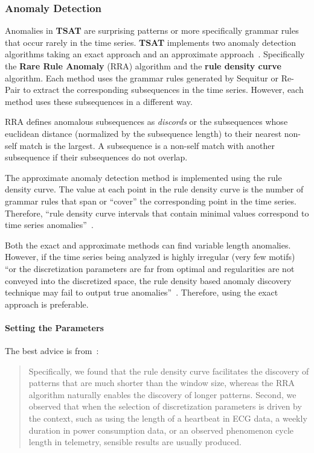 \documentclass[titlepage, letterpaper, 12pt]{article}
\newcommand\TSAT{\textbf{TSAT}}
\begin{document}
\subsubsection{Anomaly Detection}
\label{anomalybackground}




Anomalies in {\TSAT} are surprising patterns or more specifically grammar rules that occur rarely in the time series.   {\TSAT} implements two anomaly detection algorithms taking an exact approach and an approximate approach~\cite{senin2015time}.  Specifically the \textbf{Rare Rule Anomaly} (RRA) algorithm and the \textbf{rule density curve} algorithm.  Each method uses the grammar rules generated by Sequitur or Re-Pair to extract the corresponding subsequences in the time series.  However, each method uses these subsequences in a different way.

RRA defines anomalous subsequences as \textit{discords} or the subsequences whose euclidean distance (normalized by the subsequence length) to their nearest non-self match is the largest.  A subsequence is a non-self match with another subsequence if their subsequences do not overlap. 

The approximate anomaly detection method is implemented using the rule density curve.  The value at each point in the rule density curve is the number of grammar rules that span or ``cover'' the corresponding point in the time series.  Therefore, ``rule density curve intervals that contain minimal values correspond to time series anomalies''~\cite{senin2015time}.  

Both the exact and approximate methods can find variable length anomalies.  However, if the time series being analyzed is highly irregular (very few motifs) ``or the discretization parameters are far from optimal and regularities are not conveyed into the discretized space, the rule density based anomaly discovery technique may fail to output true anomalies''~\cite{senin2015time}. Therefore, using the exact approach is preferable.
\paragraph{Setting the Parameters} The best advice is from~\cite{senin2015time}:

\begin{quote}
	Specifically, we found that the rule density curve facilitates the discovery of patterns that are much shorter than the window size, whereas the RRA algorithm naturally enables the discovery of longer patterns. Second, we observed that when the selection of discretization parameters is driven by the context, such as using the length of a heartbeat in ECG data, a weekly duration in power consumption data, or an observed phenomenon cycle length in telemetry, sensible results are usually produced.
\end{quote}
\end{document}

